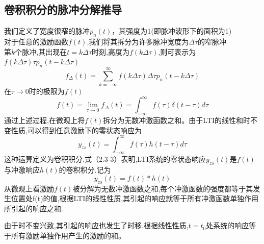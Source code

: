 \subsection{卷积积分的脉冲分解推导}
我们定义了宽度很窄的脉冲$p_n(t)$，其强度为1(即脉冲波形下的面积为1)
\\
对于任意的激励函数$f(t)$,我们将其拆分为许多脉冲宽度为$\Delta \tau$的窄脉冲
\\
第$k$个脉冲,其出现在$t=k\Delta\tau$时刻,高度为$f(k\Delta\tau)$,则可表示为$f(k\Delta \tau)\tau p_n(t-k\Delta \tau)$
\begin{equation}
    f_{\Delta}(t)=\sum_{k=-\infty}^{\infty}f(k\Delta \tau)\Delta \tau p_n(t-k\Delta \tau)
\end{equation}
在$\tau \rightarrow 0$时的极限为$f(t)$
\begin{equation}
    f(t)=\lim_{\tau \rightarrow 0}f_{\Delta}(t)=\int_{-\infty}^{\infty}f(\tau)\delta(t-\tau)d\tau
\end{equation}
通过上述过程,在微观上将$f(t)$拆分为无数冲激函数之和。由于LTI的线性和时不变性质,可以得到任意激励下的零状态响应为
\begin{equation}
    y_{zs}(t)=\int_{-\infty}^{\infty}f(\tau)h(t-\tau)d\tau
\end{equation}
这种运算定义为卷积积分.式（2.3-3）表明,LTI系统的零状态响应$y_{zs}(t)$是$f(t)$与冲激响应$h(t)$的卷积积分.记为
\begin{equation}
    y_{zs}(t)=f(t)* h(t)
\end{equation}
从微观上看激励$f(t)$被分解为无数冲激函数之和,每个冲激函数的强度都等于其发生位置处f(t)的值,根据LTI的线性性质,其引起的响应就等于所有冲激函数单独作用所引起的响应之和.

由于时不变兴致,其引起的响应也发生了时移.根据线性性质,$t=t_0$处系统的响应等于所有激励单独作用产生的激励的和。
